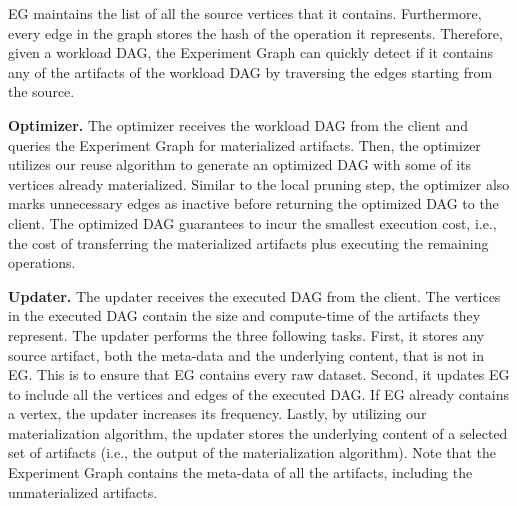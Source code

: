 EG maintains the list of all the source vertices that it contains.
Furthermore, every edge in the graph stores the hash of the operation it represents.
Therefore, given a workload DAG, the Experiment Graph can quickly detect if it contains any of the artifacts of the workload DAG by traversing the edges starting from the source.

\textbf{Optimizer. }
The optimizer receives the workload DAG from the client and queries the Experiment Graph for materialized artifacts.
Then, the optimizer utilizes our reuse algorithm to generate an optimized DAG with some of its vertices already materialized.
Similar to the local pruning step, the optimizer also marks unnecessary edges as inactive before returning the optimized DAG to the client.
The optimized DAG guarantees to incur the smallest execution cost, i.e., the cost of transferring the materialized artifacts plus executing the remaining operations.

\textbf{Updater.}
The updater receives the executed DAG from the client.
The vertices in the executed DAG contain the size and compute-time of the artifacts they represent.
The updater performs the three following tasks.
First, it stores any source artifact, both the meta-data and the underlying content, that is not in EG.
This is to ensure that EG contains every raw dataset.
Second, it updates EG to include all the vertices and edges of the executed DAG.
If EG already contains a vertex, the updater increases its frequency.
Lastly, by utilizing our materialization algorithm, the updater stores the underlying content of a selected set of artifacts (i.e., the output of the materialization algorithm).
Note that the Experiment Graph contains the meta-data of all the artifacts, including the unmaterialized artifacts.


